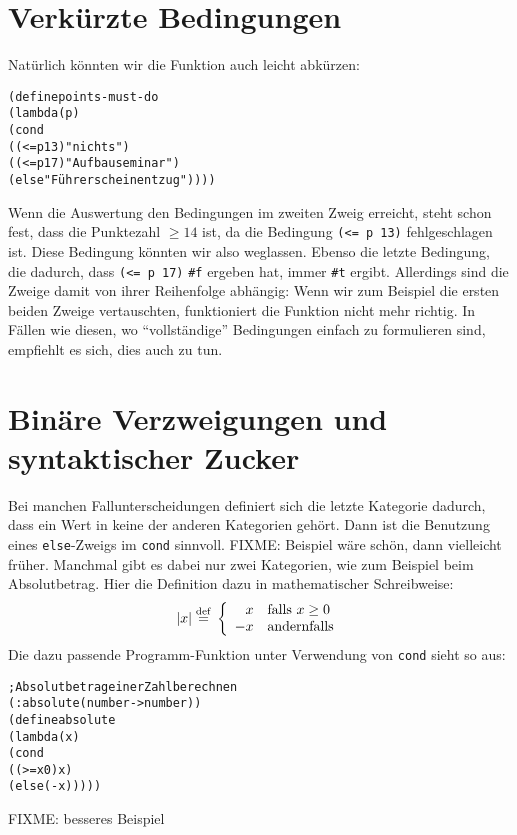 \section{Verkürzte Bedingungen}

Natürlich könnten wir die Funktion auch leicht abkürzen:
%
\begin{alltt}
(define points-must-do
  (lambda (p)
    (cond
      ((<= p 13) "nichts")
      ((<= p 17) "Aufbauseminar")
      (else "Führerscheinentzug"))))
\end{alltt}
%
Wenn die Auswertung den Bedingungen im zweiten Zweig erreicht, steht schon
fest, dass die Punktezahl $\geq 14$ ist, da die Bedingung \verb|(<= p 13)|
fehlgeschlagen ist.  Diese Bedingung könnten wir also weglassen.
Ebenso die letzte Bedingung, die dadurch, dass \verb|(<= p 17)| \verb|#f|
ergeben hat, immer \verb|#t| ergibt.  Allerdings sind die Zweige damit
von ihrer Reihenfolge abhängig: Wenn wir zum Beispiel die ersten
beiden Zweige vertauschten, funktioniert die Funktion nicht mehr
richtig.  In Fällen wie diesen, wo "`vollständige"' Bedingungen einfach zu
formulieren sind, empfiehlt es sich, dies auch zu tun.

\begin{mantra}\label{mantra:comprehensive-tests}
  
\end{mantra}

\section{Binäre Verzweigungen und syntaktischer Zucker}
\label{sec:binaere-verzweigungen}

Bei manchen Fallunterscheidungen definiert sich die letzte Kategorie
dadurch, dass ein Wert in keine der anderen Kategorien gehört.  Dann
ist die Benutzung eines \texttt{else}-Zweigs im \texttt{cond}
sinnvoll.
FIXME: Beispiel wäre schön, dann vielleicht früher.  
Manchmal gibt es dabei nur zwei Kategorien, wie
zum Beispiel beim Absolutbetrag.  Hier die Definition dazu in mathematischer
Schreibweise:
%
\begin{displaymath}
  |x| \stackrel{\rm def}{=}{} \left\{\begin{array}{rl}
      x & \textrm{falls } x \geq 0\\
      -x & \textrm{andernfalls}
    \end{array}
    \right.
\end{displaymath}
%
Die dazu passende Programm-Funktion unter Verwendung von \texttt{cond}
sieht so aus:
%
\begin{alltt}
; Absolutbetrag einer Zahl berechnen
(: absolute (number -> number))
(define absolute
  (lambda (x)
    (cond
     ((>= x 0) x)
     (else (- x)))))
\end{alltt}
FIXME: besseres Beispiel

